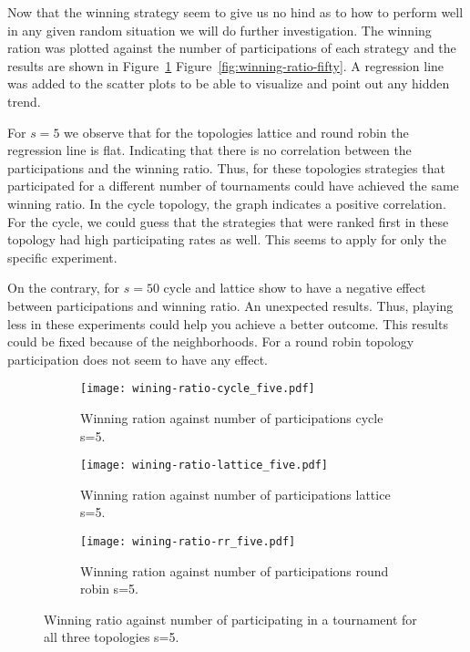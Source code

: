 Now that the winning strategy seem to give us no hind as to how to perform
well in any given random situation we will do further investigation.
The winning ration was plotted against the number of participations of each
strategy and the results are shown in Figure~\ref{fig:winning-ratio-five}
Figure~\ref{fig:winning-ratio-fifty}. A regression line was added to the scatter plots
to be able to visualize and point out any hidden trend.

For \(s=5\) we observe that for the topologies lattice and round robin
the regression line is flat. Indicating that there is no correlation between the
participations and the winning ratio. Thus, for these topologies strategies
that participated for a different number of tournaments could have achieved the
same winning ratio. In the cycle topology, the graph indicates a positive
correlation. For the cycle,
we could guess that the strategies that were ranked first in these topology had high
participating rates as well. This seems to apply for only the specific experiment.

On the contrary, for \(s=50\) cycle and lattice show to have a negative
effect between participations and winning ratio. An unexpected results. Thus, playing
less in these experiments could help you achieve a better outcome. This results
could be fixed because of the neighborhoods. For a round robin topology
participation does not seem to have any effect.

\begin{figure}[H]
\centering

    \begin{subfigure}[t]{1\textwidth}
    \centering
        \texttt{[image: wining-ratio-cycle\_five.pdf]}
    \caption{Winning ration against number of participations cycle s=5.}
    \end{subfigure}
\hfill
    \begin{subfigure}[t]{1\textwidth}\centering
    \centering
        \texttt{[image: wining-ratio-lattice\_five.pdf]}
    \caption{Winning ration against number of participations lattice s=5.}
    \end{subfigure}
\hfill
    \begin{subfigure}[t]{1\textwidth}\centering
    \centering
        \texttt{[image: wining-ratio-rr\_five.pdf]}
    \caption{Winning ration against number of participations round robin s=5.}
    \end{subfigure}
\caption{Winning ratio against number of participating in a tournament
         for all three topologies s=5.}
\label{fig:winning-ratio-five}
\end{figure}

